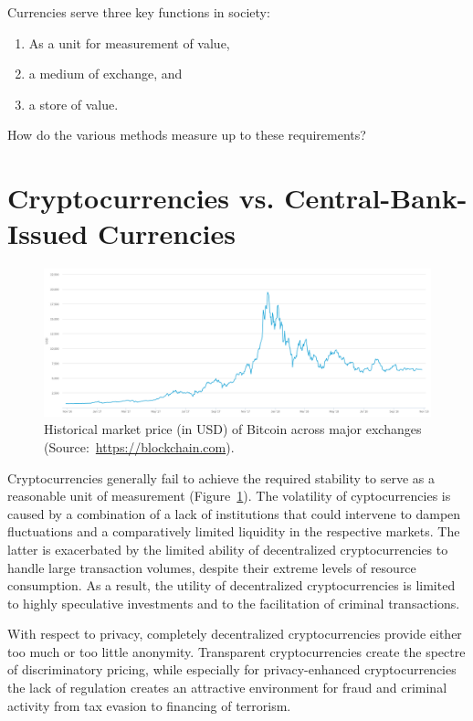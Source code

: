 Currencies serve three key functions in society:~\cite{mankiw2010macroeconomics}
\begin{enumerate}
\item As a unit for measurement of value,
\item a medium of exchange, and
\item a store of value.
\end{enumerate}
How do the various methods measure up to these requirements?

\section{Cryptocurrencies vs. Central-Bank-Issued Currencies}

\begin{figure}
\centering
\includegraphics[width=\textwidth]{diagrams/bitcoin-market-price.png}
  \caption[Historical market price of Bitcoin.]{Historical market price (in
  USD) of Bitcoin across major exchanges (Source:~\url{https://blockchain.com}).}
\label{fig:volatility}
\end{figure}

Cryptocurrencies generally fail to achieve the required stability to serve as a
reasonable unit of measurement (Figure~\ref{fig:volatility}).  The volatility
of cyptocurrencies is caused by a combination of a lack of institutions that
could intervene to dampen fluctuations and a comparatively limited liquidity
in the respective
markets.  The latter is exacerbated by the limited ability of decentralized
cryptocurrencies to handle large transaction volumes, despite their extreme
levels of resource consumption.  As a result, the utility of decentralized
cryptocurrencies is limited to highly speculative investments and to the
facilitation of criminal transactions.

With respect to privacy, completely decentralized cryptocurrencies
provide either too much or too little anonymity.  Transparent
cryptocurrencies create the spectre of discriminatory pricing, while
especially for privacy-enhanced cryptocurrencies the lack of
regulation creates an attractive environment for fraud and criminal
activity from tax evasion to financing of terrorism.

